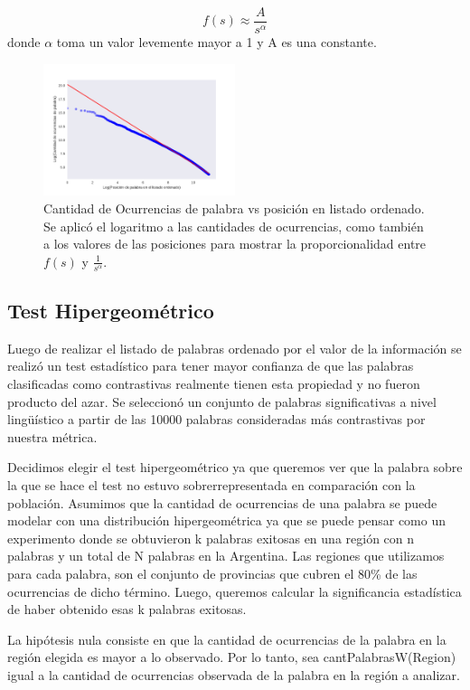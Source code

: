 $$f(s) \approx \frac{A}{s^{\alpha}}$$
donde $\alpha$ toma un valor levemente mayor a 1 y A es una constante.

\begin{figure}[!ht]
\centering
\includegraphics[width=0.5\textwidth]{./images/zipf.pdf}
\caption{Cantidad de Ocurrencias de palabra vs posición en listado ordenado. Se aplicó el logaritmo a las cantidades de ocurrencias, como también a los valores de las posiciones para mostrar la proporcionalidad entre $f(s)$ y $\frac{1}{s^{\alpha}}$.} 
\label{fig:zipf} 
\end{figure}


\subsection{Test Hipergeométrico}
Luego de realizar el listado de palabras ordenado por el valor de la información se realizó un test estadístico para tener mayor confianza de que las palabras clasificadas como contrastivas realmente tienen esta propiedad y no fueron producto del azar. Se seleccionó un conjunto de palabras significativas a nivel lingüístico a partir de las 10000 palabras consideradas más contrastivas por nuestra métrica. 

Decidimos elegir el test hipergeométrico ya que queremos ver que la palabra sobre la que se hace el test no estuvo sobrerrepresentada en comparación con la población. Asumimos que la cantidad de ocurrencias de una palabra se puede modelar con una distribución hipergeométrica ya que se puede pensar como un experimento donde se obtuvieron k palabras exitosas en una región con n palabras y un total de N palabras en la Argentina. Las regiones que utilizamos para cada palabra, son el conjunto de provincias que cubren el 80\% de las ocurrencias de dicho término. Luego, queremos calcular la significancia estadística de haber obtenido esas k palabras exitosas.

La hipótesis nula consiste en que la cantidad de ocurrencias de la palabra en la región elegida es mayor a lo observado. 
Por lo tanto, sea  cantPalabrasW(Region) igual a la cantidad de ocurrencias observada de la palabra en la región a analizar.



